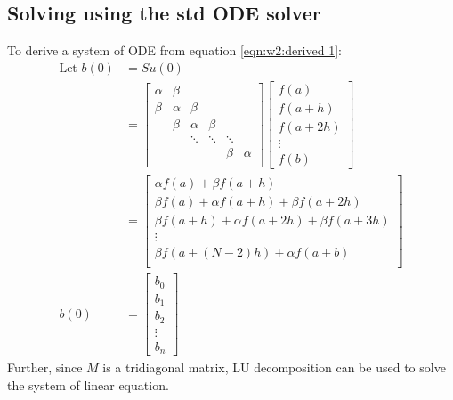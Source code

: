 \documentclass{article}
\begin{document}
\subsection{Solving using the std ODE solver}%
\label{sub:Solving using the std ODE solver}
To derive a system of ODE from equation \ref{eqn:w2:derived 1}:
\begin{align}
  \text{Let } b(0) &= S u(0) \\
                &= \begin{bmatrix}
                  \alpha & \beta & & & &       \\
                  \beta & \alpha & \beta & &   \\
                   & \beta & \alpha & \beta &  \\
                   & & \ddots & \ddots & \ddots \\
                   & & & & \beta & \alpha \\
                \end{bmatrix}
                \begin{bmatrix}
                  f(a) \\ f(a+h) \\ f(a+2h) \\ \vdots \\ f(b)
                \end{bmatrix} \\
                &= \begin{bmatrix}
                  \alpha f(a) + \beta f(a + h) \\
                  \beta f(a) + \alpha f(a+h) + \beta f(a+2h) \\
                  \beta f(a+h) + \alpha f(a+2h) + \beta f(a+3h) \\
                  \vdots \\
                  \beta f(a+(N-2)h) + \alpha f(a + b) \\
                \end{bmatrix} \\
              b(0) &= \begin{bmatrix}
                  b_0 \\ b_1 \\ b_2\\ \vdots \\ b_n
                \end{bmatrix}
\end{align}
Further, since $M$ is a tridiagonal matrix, LU decomposition can be used to solve the system of linear equation.
\end{document}
